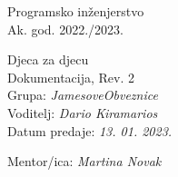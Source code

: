 \documentclass[12pt]{report}
\begin{document}
 
	
	
	
	\begin{titlepage}
		\begin{center}
			\LARGE Programsko inženjerstvo\\
			\large Ak. god. 2022./2023.\\
			
			
			\huge Djeca za djecu\\
			\Large Dokumentacija, Rev. 2\\
			
			\normalsize
			Grupa: \textit{JamesoveObveznice}\\
			Voditelj: \textit{Dario Kiramarios}\\
			
			
			Datum predaje: \textit{13. 01. 2023.}\\
	
			
			Mentor/ica: \textit{Martina Novak}\\
		
		\end{center}

	
	\end{titlepage}

	
	\tableofcontents


	
	
	
	
	
	
	
	
	
	\begingroup
	\renewcommand*\listfigurename{Indeks slika i dijagrama}
	\listoffigures
	\endgroup


	
	\eject 
		
	
\end{document}
